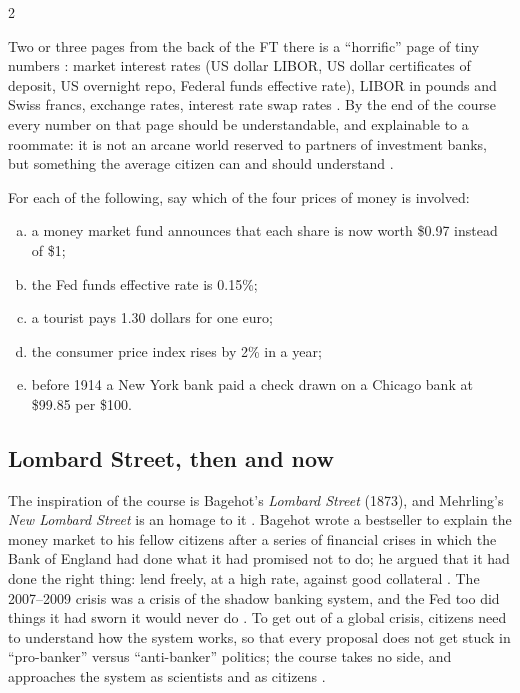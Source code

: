 \begin{paracol}{2}
\begin{finance}
Two or three pages from the back of the FT there is a ``horrific'' page of tiny numbers : market
interest rates (US dollar LIBOR, US dollar certificates of deposit, US overnight repo, Federal funds effective rate),
LIBOR in pounds and Swiss francs, exchange rates, interest rate swap rates . By the end of the course
every number on that page should be understandable, and explainable to a roommate: it is not an arcane world reserved
to partners of investment banks, but something the average citizen can and should understand .
\end{finance}

\begin{exercise}
For each of the following, say which of the four prices of money is involved:
\begin{enumerate}[(a)]
  \item a money market fund announces that each share is now worth \$0.97 instead of \$1;
  \item the Fed funds effective rate is 0.15\%;
  \item a tourist pays 1.30 dollars for one euro;
  \item the consumer price index rises by 2\% in a year;
  \item before 1914 a New York bank paid a check drawn on a Chicago bank at \$99.85 per \$100.
\end{enumerate}
\end{exercise}

\subsection{Lombard Street, then and now}
The inspiration of the course is Bagehot's \emph{Lombard Street} (1873), and Mehrling's \emph{New Lombard Street} is an
homage to it . Bagehot wrote a bestseller to explain the money market to his fellow citizens after a
series of financial crises in which the Bank of England had done what it had promised not to do; he argued that it
had done the right thing: lend freely, at a high rate, against good collateral . The 2007--2009 crisis was
a crisis of the shadow banking system, and the Fed too did things it had sworn it would never do . To get
out of a global crisis, citizens need to understand how the system works, so that every proposal does not get stuck in
``pro-banker'' versus ``anti-banker'' politics; the course takes no side, and approaches the system as scientists and as
citizens .


\end{paracol}
